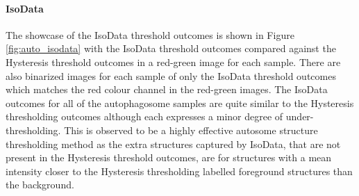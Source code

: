 \paragraph{IsoData} The showcase of the IsoData threshold outcomes is shown in Figure \ref{fig:auto_isodata} with the IsoData threshold outcomes compared against the Hysteresis threshold outcomes in a red-green image for each sample. There are also binarized images for each sample of only the IsoData threshold outcomes which matches the red colour channel in the red-green images. The IsoData outcomes for all of the autophagosome samples are quite similar to the Hysteresis thresholding outcomes although each expresses a minor degree of under-thresholding. This is observed to be a highly effective autosome structure thresholding method as the extra structures captured by IsoData, that are not present in the Hysteresis threshold outcomes, are for structures with a mean intensity closer to the Hysteresis thresholding labelled foreground structures than the background.

